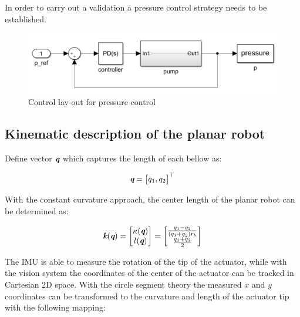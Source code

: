 In order to carry out a validation a pressure control strategy needs to be established.  


\begin{figure}[H]
    \centering
    \includegraphics[width = \linewidth]{Figures/Chapter2/pressurecontrol.png}
    \caption{Control lay-out for pressure control}
    \label{fig2:pcontrol}
\end{figure}







\subsection{Kinematic description of the planar robot}

Define vector $\textit{\textbf{q}}$ which captures the length of each bellow as:

\begin{equation}
    \textit{\textbf{q}} = \begin{bmatrix} q_1 , q_2 \end{bmatrix} ^\top
\end{equation}

With the constant curvature approach, the center length of the planar robot can be determined as:


\begin{equation}
    \textit{\textbf{k}}(\textit{\textbf{q}}) = \begin{bmatrix}  \kappa(\textit{\textbf{q}}) \\ l(\textit{\textbf{q}}) \end{bmatrix} = \begin{bmatrix} \frac{q_1-q_2}{(q_1+q_2)r_b} \\ \frac{q_1+q_2}{2} \end{bmatrix}
    \label{eq2:ccmapping}
\end{equation}

The IMU is able to measure the rotation of the tip of the actuator, while with the vision system the coordinates of the center of the actuator can be tracked in Cartesian 2D space. With the circle segment theory the measured $x$ and $y$ coordinates can be transformed to the curvature and length of the actuator tip with the following mapping:

